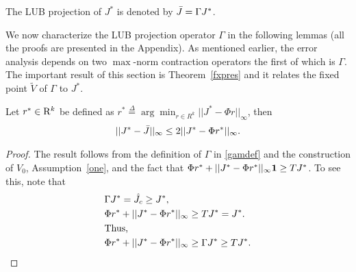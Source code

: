 \documentclass[12pt,draftcls,onecolumn]{IEEEtran}
\begin{document}
\begin{definition}\label{bestproj}
The LUB projection of $J^*$ is denoted by $\bar{J}=\Gamma J^*$.
\end{definition}
We now characterize the LUB projection operator $\Gamma$ in the following lemmas (all the proofs are presented in the Appendix). As mentioned earlier, the error analysis depends on two $\max$-norm contraction operators the first of which is $\Gamma$. The important result of this section is Theorem~\ref{fxpres} and it relates the fixed point $\tilde{V}$ of $\Gamma$ to $J^*$.
\begin{lemma}\label{bestbnd}
Let $r^*\in \mathrm{R}^k$ be defined as $r^*\stackrel{\Delta}{=}\arg\min_{r\in R^k}||J^*-\Phi r||_\infty$, then 
\begin{align}
||J^*-\bar{J}||_\infty\leq 2||J^*-\Phi r^*||_\infty.
\end{align}
\end{lemma}
\begin{proof}
The result follows from the definition of $\Gamma$ in \eqref{gamdef} and the construction of $V_0$, Assumption~\ref{one}, and the fact that $\Phi r^*+||J^*-\Phi r^*||_\infty \mathbf{1}\geq TJ^*$. To see this, note that
\begin{align}
&\Gamma J^*=\hat{J}_c \geq J^*,\nonumber\\
&\Phi r^* +||J^*-\Phi r^*||_\infty\geq TJ^*= J^*.\nonumber\\
&\text{Thus,}\nonumber\\
&\Phi r^* +||J^*-\Phi r^*||_\infty\geq \Gamma J^*\geq TJ^*.
\end{align}
\end{proof}
\end{document}
